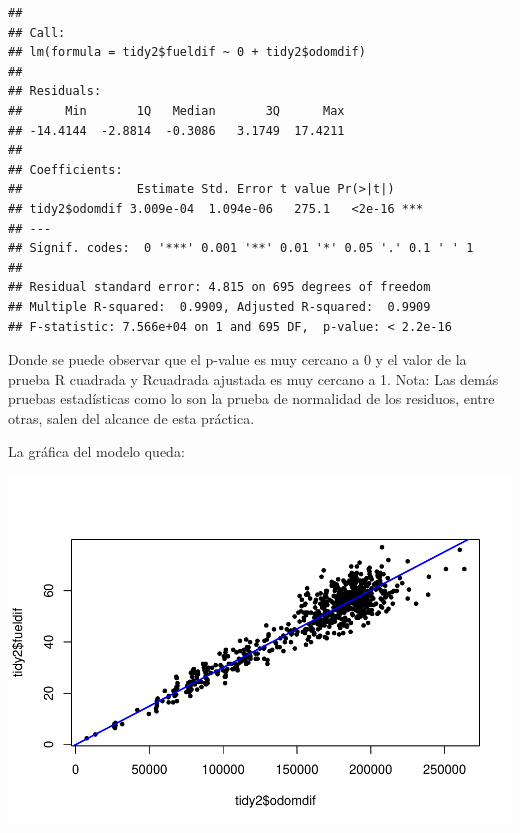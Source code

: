 \documentclass[]{article}
\newenvironment{Shaded}{\begin{snugshade}}{\end{snugshade}}
\newcommand{\KeywordTok}[1]{\textcolor[rgb]{0.13,0.29,0.53}{\textbf{#1}}}
\newcommand{\DataTypeTok}[1]{\textcolor[rgb]{0.13,0.29,0.53}{#1}}
\newcommand{\DecValTok}[1]{\textcolor[rgb]{0.00,0.00,0.81}{#1}}
\newcommand{\StringTok}[1]{\textcolor[rgb]{0.31,0.60,0.02}{#1}}
\newcommand{\OperatorTok}[1]{\textcolor[rgb]{0.81,0.36,0.00}{\textbf{#1}}}
\newcommand{\NormalTok}[1]{#1}
\begin{document}
\begin{verbatim}
## 
## Call:
## lm(formula = tidy2$fueldif ~ 0 + tidy2$odomdif)
## 
## Residuals:
##      Min       1Q   Median       3Q      Max 
## -14.4144  -2.8814  -0.3086   3.1749  17.4211 
## 
## Coefficients:
##                Estimate Std. Error t value Pr(>|t|)    
## tidy2$odomdif 3.009e-04  1.094e-06   275.1   <2e-16 ***
## ---
## Signif. codes:  0 '***' 0.001 '**' 0.01 '*' 0.05 '.' 0.1 ' ' 1
## 
## Residual standard error: 4.815 on 695 degrees of freedom
## Multiple R-squared:  0.9909, Adjusted R-squared:  0.9909 
## F-statistic: 7.566e+04 on 1 and 695 DF,  p-value: < 2.2e-16
\end{verbatim}

Donde se puede observar que el p-value es muy cercano a 0 y el valor de
la prueba R cuadrada y Rcuadrada ajustada es muy cercano a 1. Nota: Las
demás pruebas estadísticas como lo son la prueba de normalidad de los
residuos, entre otras, salen del alcance de esta práctica.

La gráfica del modelo queda:

\begin{Shaded}
\end{Shaded}

\includegraphics{practica1_files/figure-latex/unnamed-chunk-12-1.pdf}
\end{document}
